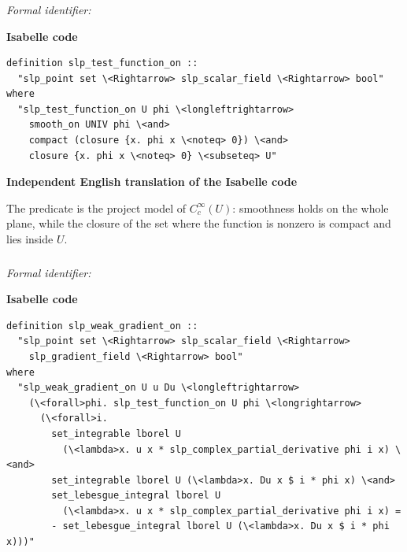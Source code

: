\documentclass[10pt,oneside]{article}
\newcommand{\reviewlabel}[1]{\par\smallskip\noindent\textsf{\bfseries #1}\par\smallskip}
\begin{document}
\subsubsection{\texttt{}}
\noindent\textit{Formal identifier:} \texttt{}

\reviewlabel{Isabelle code}
\begin{lstlisting}
definition slp_test_function_on ::
  "slp_point set \<Rightarrow> slp_scalar_field \<Rightarrow> bool"
where
  "slp_test_function_on U phi \<longleftrightarrow>
    smooth_on UNIV phi \<and>
    compact (closure {x. phi x \<noteq> 0}) \<and>
    closure {x. phi x \<noteq> 0} \<subseteq> U"
\end{lstlisting}

\reviewlabel{Independent English translation of the Isabelle code}
The predicate is the project model of $C_c^\infty(U)$: smoothness holds on the whole plane, while the closure of the set where the function is nonzero is compact and lies inside $U$.

\subsubsection{\texttt{}}
\noindent\textit{Formal identifier:} \texttt{}

\reviewlabel{Isabelle code}
\begin{lstlisting}
definition slp_weak_gradient_on ::
  "slp_point set \<Rightarrow> slp_scalar_field \<Rightarrow>
    slp_gradient_field \<Rightarrow> bool"
where
  "slp_weak_gradient_on U u Du \<longleftrightarrow>
    (\<forall>phi. slp_test_function_on U phi \<longrightarrow>
      (\<forall>i.
        set_integrable lborel U
          (\<lambda>x. u x * slp_complex_partial_derivative phi i x) \<and>
        set_integrable lborel U (\<lambda>x. Du x $ i * phi x) \<and>
        set_lebesgue_integral lborel U
          (\<lambda>x. u x * slp_complex_partial_derivative phi i x) =
        - set_lebesgue_integral lborel U (\<lambda>x. Du x $ i * phi x)))"
\end{lstlisting}
\end{document}
